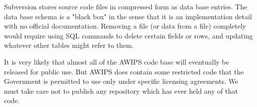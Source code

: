 Subversion stores source code files in compressed form as
data base entries.  The data base schema is a "black box" in
the sense that it is an implementation detail with no
official documentation.  Removing a file (or data from a
file)  completely would
require using SQL commands to delete certain
fields or rows, and updating whatever other tables might
refer to them.

It is very likely that almost all of the AWIPS code base will 
eventually be
released for public use.  But AWIPS does contain some restricted
code that the Government is permitted to use only under specific
licensing agreements.  We must take care not to publish any
repository which has ever held any of that code.


